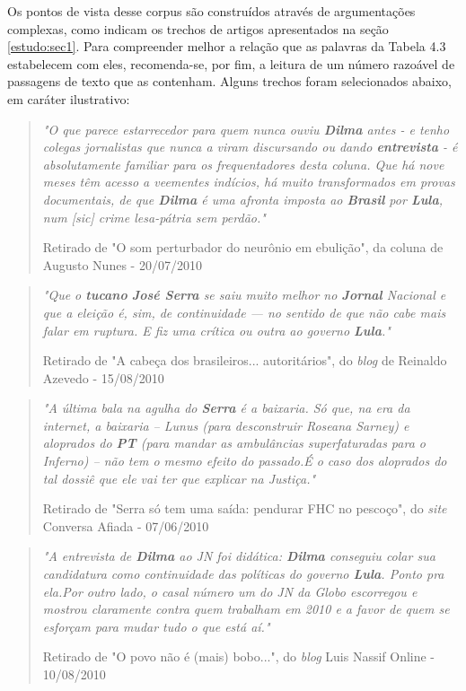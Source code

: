 Os pontos de vista desse corpus são construídos através de argumentações complexas, como indicam os trechos de artigos apresentados na seção \ref{estudo:sec1}. Para compreender melhor a relação que as palavras da Tabela 4.3 estabelecem com eles, recomenda-se, por fim, a leitura de um número razoável de passagens de texto que as contenham. Alguns trechos foram selecionados abaixo, em caráter ilustrativo:

\begin{quote}
\emph{"O que parece estarrecedor para quem nunca ouviu \textbf{Dilma} antes - e tenho colegas jornalistas que nunca a viram discursando ou dando \textbf{entrevista} - é absolutamente familiar para os frequentadores desta coluna. Que há nove meses têm acesso a veementes indícios, há muito transformados em provas documentais, de que \textbf{Dilma} é uma afronta imposta ao \textbf{Brasil} por \textbf{Lula}, num [sic] crime lesa-pátria sem perdão."}

{\small Retirado de "O som perturbador do neurônio em ebulição", da coluna de Augusto Nunes - 20/07/2010}
\end{quote}

\begin{quote}
\emph{"Que o \textbf{tucano} \textbf{José Serra} se saiu muito melhor no \textbf{Jornal} Nacional e que a eleição é, sim, de continuidade — no sentido de que não cabe mais falar em ruptura. E fiz uma crítica ou outra ao governo \textbf{Lula}."}

{\small Retirado de "A cabeça dos brasileiros... autoritários", do \emph{blog} de Reinaldo Azevedo - 15/08/2010}
\end{quote}

\begin{quote}

\emph{"A última bala na agulha do \textbf{Serra} é a baixaria. Só que, na era da internet, a baixaria – Lunus (para desconstruir Roseana Sarney) e aloprados do \textbf{PT} (para mandar as ambulâncias superfaturadas para o Inferno) – não tem o mesmo efeito do passado.É o caso dos aloprados do tal dossiê que ele vai ter que explicar na Justiça."}

{\small Retirado de "Serra só tem uma saída: pendurar FHC no pescoço", do \emph{site} Conversa Afiada - 07/06/2010}
\end{quote}

\begin{quote}
\emph{"A entrevista de \textbf{Dilma} ao JN foi didática: \textbf{Dilma} conseguiu colar sua candidatura como continuidade das políticas do governo \textbf{Lula}. Ponto pra ela.Por outro lado, o casal número um do JN da Globo escorregou e mostrou claramente contra quem trabalham em 2010 e a favor de quem se esforçam para mudar tudo o que está aí."}

{\small Retirado de "O povo não é (mais) bobo...", do \emph{blog} Luis Nassif Online - 10/08/2010}
\end{quote}


